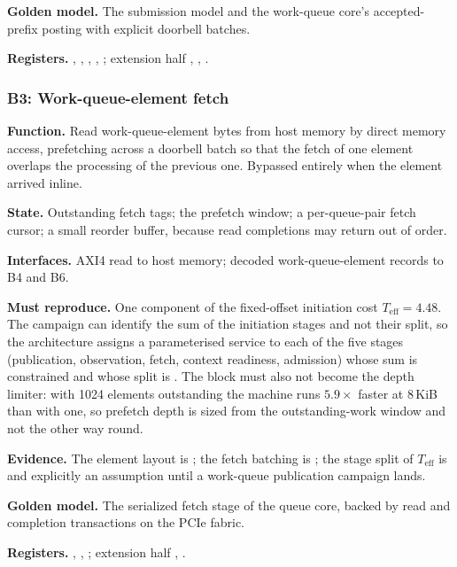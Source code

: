 \textbf{Golden model.} The submission model and the work-queue core's
accepted-prefix posting with explicit doorbell batches.

{\raggedright
\textbf{Registers.} , , ,
, ; extension half
, ,
.\par}

\subsubsection{B3: Work-queue-element fetch}

\textbf{Function.} Read work-queue-element bytes from host memory by direct
memory access, prefetching across a doorbell batch so that the fetch of one
element overlaps the processing of the previous one. Bypassed entirely when the
element arrived inline.

\textbf{State.} Outstanding fetch tags; the prefetch window; a per-queue-pair
fetch cursor; a small reorder buffer, because read completions may return out
of order.

\textbf{Interfaces.} AXI4 read to host memory; decoded work-queue-element
records to B4 and B6.

\textbf{Must reproduce.} One component of the fixed-offset initiation cost
$T_{\text{eff}} = 4.48$\uS{}. The campaign can identify the sum of the
initiation stages and not their split, so the architecture assigns a
parameterised service to each of the five stages (publication, observation,
fetch, context readiness, admission) whose sum is constrained and whose split
is \evcal{}. The block must also not become the depth limiter: with 1024
elements outstanding the machine runs $5.9\times$ faster at 8\,KiB than with
one, so prefetch depth is sized from the outstanding-work window and not the
other way round.

\textbf{Evidence.} The element layout is \evdoc{}; the fetch batching is
\evdrv{}; the stage split of $T_{\text{eff}}$ is \evcal{} and explicitly an
assumption until a work-queue publication campaign lands.

\textbf{Golden model.} The serialized fetch stage of the queue core, backed by
read and completion transactions on the PCIe fabric.

{\raggedright
\textbf{Registers.} , ,
; extension half ,
.\par}

